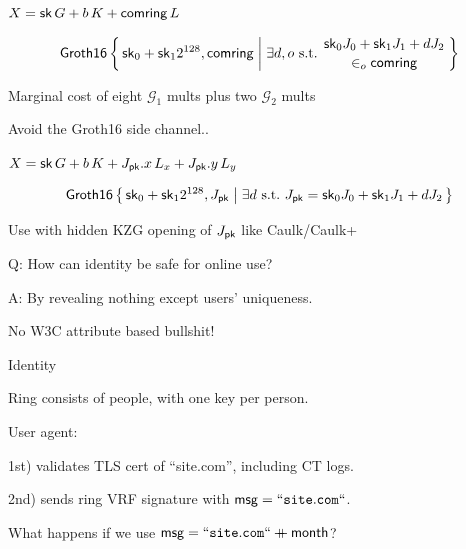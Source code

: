 \documentclass{beamer}
\def\comring{\ensuremath{\mathsf{comring}}\xspace}
\begin{document}
\begin{frame}

$X = \sk \, G + b \, K + \comring \, L$

\medskip

$$ \mathsf{Groth16} \Setst{ \sk_0 + \sk_1 2^{128}, \comring }{
    \exists d,o \textrm{\ s.t.\ }
	\genfrac{}{}{0pt}{}{ \sk_0 J_0 + \sk_1 J_1 + d J_2 }{ \in_o \comring }
} $$

\hspace{5pt} Marginal cost of eight $\mathcal{G}_1$ mults plus two $\mathcal{G}_2$ mults

\end{frame}



\begin{frame}
	
Avoid the Groth16 side channel..

\bigskip

$X = \mathsf{sk} \, G + b \, K + J_\mathsf{pk}.x \, L_x + J_\mathsf{pk}.y \, L_y$

\medskip

$$ \mathsf{Groth16} \Setst{ \sk_0 + \sk_1 2^{128}, J_\pk }{ 
	\exists d \textrm{\ s.t.\ }
	J_\pk = \sk_0 J_0 + \sk_1 J_1 + d J_2
} $$

\hspace{5pt} Use with hidden KZG opening of $J_\mathsf{pk}$ like Caulk/Caulk+

\end{frame}



\begin{frame} %
	
Q: How can identity be safe for online use?

\bigskip

A: By revealing nothing except users' uniqueness.

\bigskip\bigskip

\hspace{10pt} No W3C attribute based bullshit!

\end{frame}



\begin{frame}{Identity}

Ring consists of people, with one key per person.

\bigskip\bigskip

User agent: \\ \medskip

1st) validates TLS cert of ``site.com'', including CT logs. \\ \medskip

2nd) sends ring VRF signature with $\mathsf{msg} = \mathtt{``site.com``}$. \\ \medskip

\pause\bigskip\bigskip 

What happens if we use $\mathsf{msg} = \mathtt{``site.com``} \mathbin{+\mkern-10mu+} \mathsf{month}$?

\end{frame}
\end{document}
